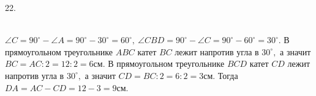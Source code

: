 22. \begin{figure}[ht!]
\end{figure}\\
$\angle C=90^\circ-\angle A=90^\circ-30^\circ=60^\circ,\ \angle CBD=90^\circ-\angle C=90^\circ-60^\circ=30^\circ.$ В прямоугольном треугольнике $ABC$ катет $BC$ лежит напротив угла в $30^\circ,$ а значит $BC=AC:2=12:2=6$см. В прямоугольном треугольнике $BCD$ катет $CD$ лежит напротив угла в $30^\circ,$ а значит $CD=BC:2=6:2=3$см. Тогда $DA=AC-CD=12-3=9$см.\\
